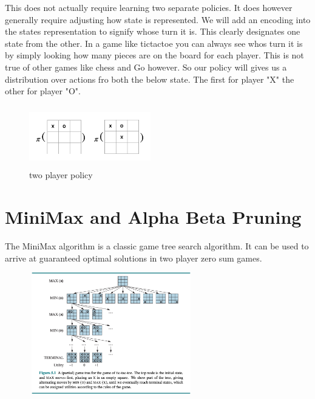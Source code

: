 This does not actually require learning two separate policies. It does however generally require adjusting how state is represented. We will add an encoding into the states representation to signify whose turn it is. This clearly designates one state from the other. In a game like tictactoe you can always see whos turn it is by simply looking how many pieces are on the board for each player. This is not true of other games like chess and Go however. So our policy will gives us a distribution over actions fro both the below state. The first for player "X" the other for player "O". 

\begin{figure}[H]
    \centering
    \includegraphics[width=200px,height=100px]{images/2playerpolicy.png}
    \caption{two player policy}
    \label{fig:2p-policy}
\end{figure}

\section{MiniMax and Alpha Beta Pruning}

The MiniMax algorithm is a classic game tree search algorithm. It can be used to arrive at guaranteed optimal solutions in two player zero sum games. 

\includegraphics[width=350px,height=200px]{images/aim_figure_5_1.png}

